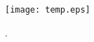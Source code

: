 \documentclass[12pt]{article}
\begin{document}
\lipsum




\begin{figure}
\centering
\texttt{[image: temp.eps]}
\caption{ .  }
\label{temp}
\end{figure}
\end{document}
